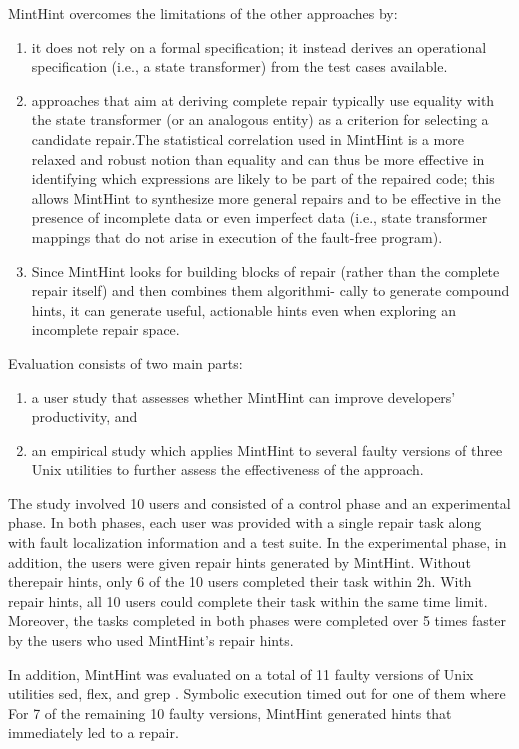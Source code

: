 \documentclass[10pt, conference, compsocconf]{IEEEtran}
\begin{document}
MintHint overcomes the limitations of the other approaches by:
\begin{enumerate}
\item it does not rely on a formal specification; it instead derives an operational specification (i.e., a state transformer) from the test cases available.
\item approaches that aim at deriving complete repair typically use equality with the state transformer (or an analogous entity) as a criterion for selecting a candidate repair.The statistical correlation used in MintHint is a more relaxed and robust notion than
equality and can thus be more effective in identifying which expressions are likely to be part of the repaired code; this allows MintHint to synthesize more general repairs and to be effective in the presence of incomplete data or even imperfect data (i.e., state transformer mappings that do not arise in execution of the fault-free program).

\item Since MintHint looks for building blocks of repair (rather than the complete repair itself) and then combines them algorithmi-
cally to generate compound hints, it can generate useful, actionable hints even when exploring an incomplete repair space.
\end{enumerate}




Evaluation consists of two main parts: 
\begin{enumerate}
\item a user study that assesses whether MintHint can improve developers’ productivity, and
\item an empirical study which applies MintHint to several faulty versions of three Unix utilities to further assess the effectiveness of the approach.
\end{enumerate}
 The study involved 10 users and consisted of a control phase and an experimental phase. In both phases,  each user was provided with a single repair task along with fault localization information and a test suite. In the experimental phase, in addition,  the users were given repair hints generated by MintHint.  Without therepair hints, only 6 of the 10 users completed
their task within 2h. With repair hints, all 10 users could complete their task within the same time limit. Moreover, the tasks completed in both phases were completed over 5 times faster by the users who used MintHint’s repair hints.

In addition, MintHint was evaluated on a total of 11 faulty versions of Unix utilities sed, flex, and grep . Symbolic execution timed
out for one of them where For 7 of the remaining 10 faulty versions, MintHint generated hints that immediately led to a repair.
\end{document}
